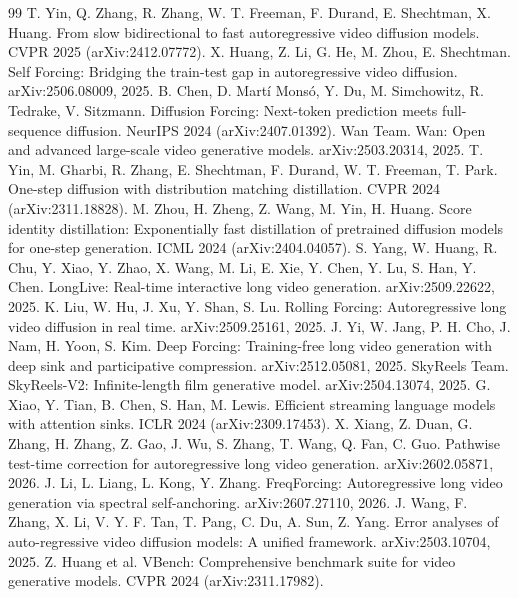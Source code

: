 \begin{thebibliography}{99}\small
{} T. Yin, Q. Zhang, R. Zhang, W. T. Freeman, F. Durand, E. Shechtman, X. Huang. From slow bidirectional to fast autoregressive video diffusion models. CVPR 2025 (arXiv:2412.07772).
 X. Huang, Z. Li, G. He, M. Zhou, E. Shechtman. Self Forcing: Bridging the train-test gap in autoregressive video diffusion. arXiv:2506.08009, 2025.
 B. Chen, D. Mart\'i Mons\'o, Y. Du, M. Simchowitz, R. Tedrake, V. Sitzmann. Diffusion Forcing: Next-token prediction meets full-sequence diffusion. NeurIPS 2024 (arXiv:2407.01392).
 Wan Team. Wan: Open and advanced large-scale video generative models. arXiv:2503.20314, 2025.
 T. Yin, M. Gharbi, R. Zhang, E. Shechtman, F. Durand, W. T. Freeman, T. Park. One-step diffusion with distribution matching distillation. CVPR 2024 (arXiv:2311.18828).
 M. Zhou, H. Zheng, Z. Wang, M. Yin, H. Huang. Score identity distillation: Exponentially fast distillation of pretrained diffusion models for one-step generation. ICML 2024 (arXiv:2404.04057).
 S. Yang, W. Huang, R. Chu, Y. Xiao, Y. Zhao, X. Wang, M. Li, E. Xie, Y. Chen, Y. Lu, S. Han, Y. Chen. LongLive: Real-time interactive long video generation. arXiv:2509.22622, 2025.
 K. Liu, W. Hu, J. Xu, Y. Shan, S. Lu. Rolling Forcing: Autoregressive long video diffusion in real time. arXiv:2509.25161, 2025.
 J. Yi, W. Jang, P. H. Cho, J. Nam, H. Yoon, S. Kim. Deep Forcing: Training-free long video generation with deep sink and participative compression. arXiv:2512.05081, 2025.
 SkyReels Team. SkyReels-V2: Infinite-length film generative model. arXiv:2504.13074, 2025.
 G. Xiao, Y. Tian, B. Chen, S. Han, M. Lewis. Efficient streaming language models with attention sinks. ICLR 2024 (arXiv:2309.17453).
 X. Xiang, Z. Duan, G. Zhang, H. Zhang, Z. Gao, J. Wu, S. Zhang, T. Wang, Q. Fan, C. Guo. Pathwise test-time correction for autoregressive long video generation. arXiv:2602.05871, 2026.
 J. Li, L. Liang, L. Kong, Y. Zhang. FreqForcing: Autoregressive long video generation via spectral self-anchoring. arXiv:2607.27110, 2026.
 J. Wang, F. Zhang, X. Li, V. Y. F. Tan, T. Pang, C. Du, A. Sun, Z. Yang. Error analyses of auto-regressive video diffusion models: A unified framework. arXiv:2503.10704, 2025.
 Z. Huang et al. VBench: Comprehensive benchmark suite for video generative models. CVPR 2024 (arXiv:2311.17982).

\end{thebibliography}
